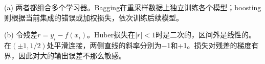 (a) 两者都组合多个学习器。Bagging在重采样数据上独立训练各个模型；boosting则根据当前集成的错误或加权损失，依次训练后续模型。


(b) 令残差\(r=y_i-f(x_i)\)。Huber损失在\(|r|<1\)时是二次的，区间外是线性的。在\((\pm1,1/2)\)处平滑连接，两侧直线的斜率分别为\ensuremath{-}1和+1。损失对残差的梯度有界，因此对大的输出误差不那么敏感。

